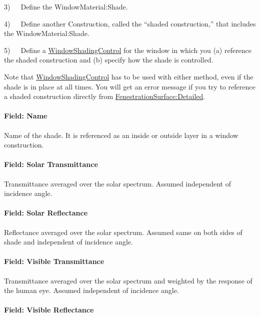 3)~~~Define the WindowMaterial:Shade.

4)~~~Define another Construction, called the ``shaded construction,'' that includes the WindowMaterial:Shade.

5)~~~Define a \hyperref[windowpropertyshadingcontrol]{WindowShadingControl} for the window in which you (a) reference the shaded construction and (b) specify how the shade is controlled.

Note that \hyperref[windowpropertyshadingcontrol]{WindowShadingControl} has to be used with either method, even if the shade is in place at all times. You will get an error message if you try to reference a shaded construction directly from \hyperref[fenestrationsurfacedetailed]{FenestrationSurface:Detailed}.

\paragraph{Field: Name}\label{field-name-16-009}

Name of the shade. It is referenced as an inside or outside layer in a window construction.

\paragraph{Field: Solar Transmittance}\label{field-solar-transmittance}

Transmittance averaged over the solar spectrum. Assumed independent of incidence angle.

\paragraph{Field: Solar Reflectance}\label{field-solar-reflectance}

Reflectance averaged over the solar spectrum. Assumed same on both sides of shade and independent of incidence angle.

\paragraph{Field: Visible Transmittance}\label{field-visible-transmittance-1}

Transmittance averaged over the solar spectrum and weighted by the response of the human eye. Assumed independent of incidence angle.

\paragraph{Field: Visible Reflectance}\label{field-visible-reflectance}

